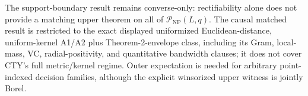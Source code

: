 The support-boundary result remains converse-only: rectifiability alone does not provide a matching upper theorem on all of \(\mathcal P_{\mathrm{NP}}(L,q)\).  The causal matched result is restricted to the exact displayed uniformized Euclidean-distance, uniform-kernel A1/A2 plus Theorem-2-envelope class, including its Gram, local-mass, VC, radial-positivity, and quantitative bandwidth clauses; it does not cover CTY's full metric/kernel regime.  Outer expectation is needed for arbitrary point-indexed decision families, although the explicit winsorized upper witness is jointly Borel.